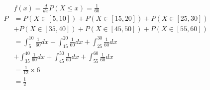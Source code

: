 \documentclass{article}
\begin{document}
\begin{equation*}
    \begin{split}
            &f(x)=\frac{d}{dx}P(X\leqslant x)=\frac{1}{60}\\
            P&=P(X\in [5,10])+P(X\in [15,20])+P(X\in [25,30])\\
            &+P(X\in [35,40])+P(X\in [45,50])+P(X\in [55,60])\\
            &=\int_{5}^{10}\frac{1}{60}dx+\int_{15}^{20}\frac{1}{60}dx+\int_{25}^{30}\frac{1}{60}dx\\
            &+\int_{35}^{40}\frac{1}{60}dx+\int_{45}^{50}\frac{1}{60}dx+\int_{55}^{60}\frac{1}{60}dx\\
            &=\frac{1}{12}\times6\\
            &=\frac{1}{2}\\
    \end{split}
\end{equation*}
\end{document}
